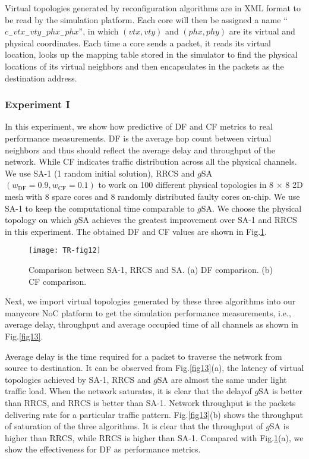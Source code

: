 Virtual topologies generated by reconfiguration algorithms are in XML format to be read by the simulation platform. Each core will then be assigned a name “$c_{-} v t x_{-} v t y_{-} p h x_{-} p h x$”, in which $(v t x, v t y)$  and $(phx, phy)$ are its virtual and physical coordinates. Each time a core sends a packet, it reads its virtual location, looks up the mapping table stored in the simulator to find the physical locations of its virtual neighbors and then encapsulates in the packets as the destination address.

\subsubsection{Experiment I}
In this experiment, we show how predictive of DF and CF metrics to real performance measurements. DF is the average hop count between virtual neighbors and thus should reflect the average delay and throughput of the network. While CF indicates traffic distribution across all the physical channels. We use SA-1 (1 random initial solution), RRCS and $g$SA $\left(w_{\mathrm{DF}}=0.9, w_{\mathrm{CF}}=0.1\right)$  to work on 100 different physical topologies in 8 $\times$ 8 2D mesh with 8 spare cores and 8 randomly distributed faulty cores on-chip. We use SA-1 to keep the computational time comparable to $g$SA. We choose the physical topology on which $g$SA achieves the greatest improvement over SA-1 and RRCS in this experiment. The obtained DF and CF values are shown in Fig.\ref{fig12}.

\begin{figure}[h]
      \centering
        \texttt{[image: TR-fig12]}
          \caption{ Comparison between SA-1, RRCS and SA. (a) DF comparison. (b) CF comparison.}
        \label{fig12}
\end{figure}


Next, we import virtual topologies generated by these three algorithms into our manycore NoC platform to get the simulation performance measurements, i.e., average delay, throughput and average occupied time of all channels as shown in Fig.\ref{fig13}. 

Average delay is the time required for a packet to traverse the network from source to destination. It can be observed from Fig.\ref{fig13}(a), the latency of virtual topologies achieved by SA-1, RRCS and $g$SA are almost the same under light traffic load. When the network saturates, it is clear that the delayof $g$SA is better than RRCS, and RRCS is better than SA-1. Network throughput is the packets delivering rate for a particular traffic pattern. Fig.\ref{fig13}(b) shows the throughput of saturation of the three algorithms. It is clear that the throughput of $g$SA is higher than RRCS, while RRCS is higher than SA-1. Compared with Fig.\ref{fig12}(a), we show the effectiveness for DF as performance metrics.

